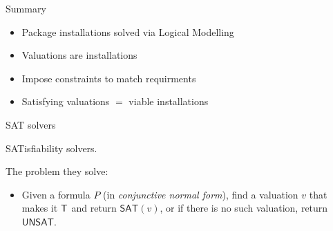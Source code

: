 \documentclass[xetex,aspectratio=169,14pt,hyperref={pdfpagelabels=true,pdflang={en-GB}}]{beamer}
\begin{document}
\begin{frame}
  {Summary}

  \begin{itemize}
  \item Package installations solved via Logical Modelling
  \item Valuations are installations
  \item Impose constraints to match requirments
  \item Satisfying valuations $=$ viable installations
  \end{itemize}
\end{frame}



\begin{frame}
  {SAT solvers}

  SATisfiability solvers.

  \bigskip

  The problem they solve:
  \begin{itemize}
  \item Given a formula $P$ (in \emph{conjunctive normal form}), find
    a valuation $v$ that makes it $\mathsf{T}$ and return
    $\mathsf{SAT}(v)$, or if there is no such valuation, return
    $\mathsf{UNSAT}$.
  \end{itemize}
\end{frame}
\end{document}
